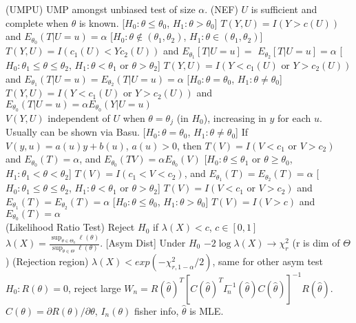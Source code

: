 \documentclass{article}
\renewcommand{\subsection}[1]{\text{\hl{[#1]}}}
\newcommand{\compact}{\\}
\begin{document}
\subsection{UMPU}
(UMPU) UMP amongst unbiased test of size $\alpha$.
(NEF) $U$ is sufficient and complete when $\theta$ is known.
    [$H_0: \theta \leq \theta_0$, $H_1: \theta > \theta_0$]
$T(Y, U) = I(Y > c(U))$ and $E_{\theta_0}(T | U=u) = \alpha$
[$H_0: \theta \notin (\theta_1, \theta_2)$, $H_1: \theta \in (\theta_1, \theta_2)$]
$T(Y, U) = I(c_1(U) < Y c_2(U))$ and
$E_{\theta_1}[T | U=u] = $ $E_{\theta_2}[T | U=u] = \alpha$
[$H_0: \theta_1 \leq \theta \leq \theta_2$, $H_1: \theta < \theta_1$ or
        $\theta > \theta_2$]
$T(Y, U) = I(Y <c_1(U) \text{ or } Y > c_2(U))$
and $E_{\theta_1}(T|U=u)=E_{\theta_2}(T|U=u)=\alpha$
[$H_0: \theta = \theta_0$, $H_1: \theta \neq \theta_0$]
$T(Y, U) = I(Y <c_1(U) \text{ or } Y > c_2(U))$
and $E_{\theta_0}(T|U=u) = \alpha E_{\theta_0}(Y|U=u)$
\compact
\subsection{UMPU, Normal}
$V(Y, U)$ independent of $U$ when $\theta=\theta_j$ (in $H_0$),
increasing in $y$ for each $u$. Usually can be shown via Basu.
    [$H_0: \theta = \theta_0$, $H_1: \theta \neq \theta_0$]
If $V(y, u) = a(u)y + b(u)$, $a(u) > 0$, then
$T(V) = I(V < c_1 \text{ or } V > c_2)$ and
$E_{\theta_0}(T) = \alpha$, and
$E_{\theta_0}(TV) = \alpha E_{\theta_0}(V)$
[$H_0: \theta \leq \theta_1 \text{ or } \theta \geq \theta_0$,
        $H_1: \theta_1 < \theta < \theta_2$]
$T(V) = I(c_1 < V < c_2)$, and
$E_{\theta_1}(T) = E_{\theta_2}(T) = \alpha$
[$H_0: \theta_1 \leq \theta \leq \theta_2$,
        $H_1: \theta < \theta_1$ or $\theta > \theta_2$]
$T(V) = I(V < c_1 \text{ or } V > c_2)$ and
$E_{\theta_1}(T) = E_{\theta_2}(T) = \alpha$
[$H_0: \theta \leq \theta_0$, $H_1: \theta > \theta_0$]
$T(V) = I(V>c)$ and $E_{\theta_0}(T)=\alpha$
\compact
\subsection{LRT}
(Likelihood Ratio Test) Reject $H_0$ if $\lambda(X) < c$, $c\in[0, 1]$
$\lambda(X) = \frac{\sup_{\theta\in\Theta_0}
        \ell(\theta)}{\sup_{\theta\in\Theta} \ell(\theta)}$.
    [Asym Dist] Under $H_0$ $-2\log\lambda(X) \rightarrow \chi_r^2$ (r is dim
of $\Theta$)
(Rejection region) $\lambda(X) < exp(-\chi_{r, 1 - \alpha}^2 / 2)$,
same for other asym test
\compact
\subsection{Wald's test}
$H_0: R(\theta) = 0$, reject large
$W_n = R(\hat\theta)^T [C(\hat\theta)^T I_n^{-1}(\hat\theta)
    C(\hat\theta)]^{-1} R(\hat\theta)$.
$C(\theta) = \partial R(\theta) / \partial \theta$,
$I_n(\theta)$ fisher info,
$\hat\theta$ is MLE.
\compact
\end{document}
